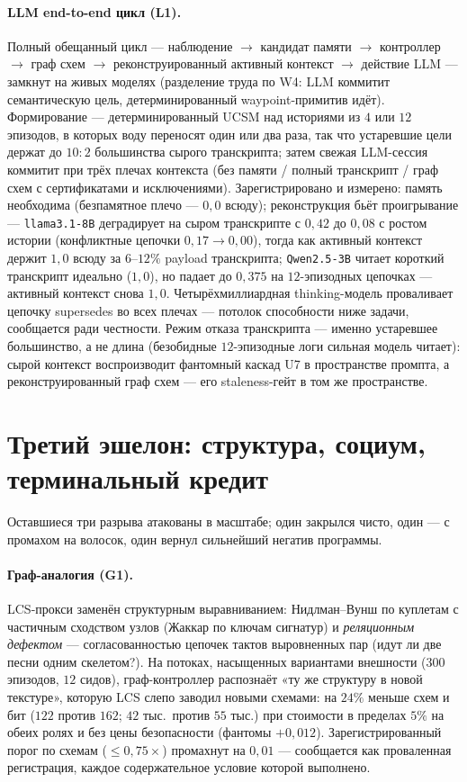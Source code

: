 \documentclass{article}
\begin{document}
\paragraph{LLM end-to-end цикл (L1).} Полный обещанный цикл ---
наблюдение $\to$ кандидат памяти $\to$ контроллер $\to$ граф схем
$\to$ реконструированный активный контекст $\to$ действие LLM ---
замкнут на живых моделях (разделение труда по W4: LLM коммитит
семантическую цель, детерминированный waypoint-примитив идёт).
Формирование --- детерминированный UCSM над историями из $4$ или
$12$ эпизодов, в которых воду переносят один или два раза, так что
устаревшие цели держат до $10{:}2$ большинства сырого транскрипта;
затем свежая LLM-сессия коммитит при трёх плечах контекста (без
памяти / полный транскрипт / граф схем с сертификатами и
исключениями). Зарегистрировано и измерено: память необходима
(безпамятное плечо --- $0{,}0$ всюду); реконструкция бьёт
проигрывание --- \texttt{llama3.1-8B} деградирует на сыром
транскрипте с $0{,}42$ до $0{,}08$ с ростом истории (конфликтные
цепочки $0{,}17 \to 0{,}00$), тогда как активный контекст держит
$1{,}0$ всюду за $6$--$12\%$ payload транскрипта;
\texttt{Qwen2.5-3B} читает короткий транскрипт идеально ($1{,}0$), но
падает до $0{,}375$ на $12$-эпизодных цепочках --- активный контекст
снова $1{,}0$. Четырёхмиллиардная thinking-модель проваливает цепочку
supersedes во всех плечах --- потолок способности ниже задачи,
сообщается ради честности. Режим отказа транскрипта --- именно
устаревшее большинство, а не длина (безобидные $12$-эпизодные логи
сильная модель читает): сырой контекст воспроизводит фантомный каскад
U7 в пространстве промпта, а реконструированный граф схем --- его
staleness-гейт в том же пространстве.


\section{Третий эшелон: структура, социум, терминальный кредит}
\label{sec:echelon3}

Оставшиеся три разрыва атакованы в масштабе; один закрылся чисто,
один --- с промахом на волосок, один вернул сильнейший негатив
программы.

\paragraph{Граф-аналогия (G1).} LCS-прокси заменён структурным
выравниванием: Нидлман--Вунш по куплетам с частичным сходством узлов
(Жаккар по ключам сигнатур) и \emph{реляционным дефектом} ---
согласованностью цепочек тактов выровненных пар (идут ли две песни
одним скелетом?). На потоках, насыщенных вариантами внешности
($300$ эпизодов, $12$ сидов), граф-контроллер распознаёт «ту же
структуру в новой текстуре», которую LCS слепо заводил новыми
схемами: на $24\%$ меньше схем и бит ($122$ против $162$; $42$ тыс.\
против $55$ тыс.) при стоимости в пределах $5\%$ на обеих ролях и
без цены безопасности (фантомы $+0{,}012$). Зарегистрированный порог
по схемам ($\le 0{,}75\times$) промахнут на $0{,}01$ --- сообщается
как проваленная регистрация, каждое содержательное условие которой
выполнено.
\end{document}
